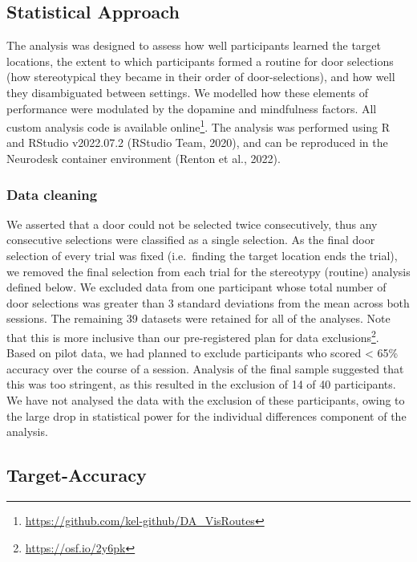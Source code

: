 \documentclass[
  man]{apa6}
\begin{document}
\hypertarget{statistical-approach}{%
\subsection{Statistical Approach}\label{statistical-approach}}

\label{sec:Statistical Approach}

The analysis was designed to assess how well participants learned the target locations, the extent to which participants formed a routine for door selections (how stereotypical they became in their order of door-selections), and how well they disambiguated between settings. We modelled how these elements of performance were modulated by the dopamine and mindfulness factors. All custom analysis code is available online\footnote{\url{https://github.com/kel-github/DA_VisRoutes}}. The analysis was performed using R and RStudio v2022.07.2 (RStudio Team, 2020), and can be reproduced in the Neurodesk container environment (Renton et al., 2022).

\hypertarget{data-cleaning}{%
\subsubsection{Data cleaning}\label{data-cleaning}}

\label{sec:Data cleaning}

We asserted that a door could not be selected twice consecutively, thus any consecutive selections were classified as a single selection. As the final door selection of every trial was fixed (i.e.~finding the target location ends the trial), we removed the final selection from each trial for the stereotypy (routine) analysis defined below. We excluded data from one participant whose total number of door selections was greater than 3 standard deviations from the mean across both sessions. The remaining 39 datasets were retained for all of the analyses. Note that this is more inclusive than our pre-registered plan for data exclusions\footnote{\url{https://osf.io/2y6pk}}. Based on pilot data, we had planned to exclude participants who scored \textless{} 65\% accuracy over the course of a session. Analysis of the final sample suggested that this was too stringent, as this resulted in the exclusion of 14 of 40 participants. We have not analysed the data with the exclusion of these participants, owing to the large drop in statistical power for the individual differences component of the analysis.

\hypertarget{target-accuracy}{%
\subsection{Target-Accuracy}\label{target-accuracy}}
\end{document}

